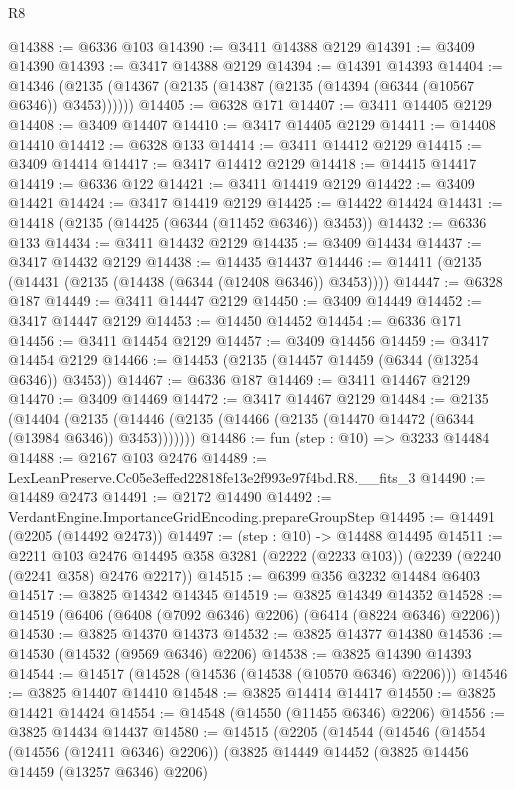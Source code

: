 \begin{lexlean}{R8}
\begin{coremodule}
@14388 := @6336 @103
@14390 := @3411 @14388 @2129
@14391 := @3409 @14390
@14393 := @3417 @14388 @2129
@14394 := @14391 @14393
@14404 := @14346 (@2135 (@14367 (@2135 (@14387 (@2135 (@14394 (@6344 (@10567 @6346)) @3453))))))
@14405 := @6328 @171
@14407 := @3411 @14405 @2129
@14408 := @3409 @14407
@14410 := @3417 @14405 @2129
@14411 := @14408 @14410
@14412 := @6328 @133
@14414 := @3411 @14412 @2129
@14415 := @3409 @14414
@14417 := @3417 @14412 @2129
@14418 := @14415 @14417
@14419 := @6336 @122
@14421 := @3411 @14419 @2129
@14422 := @3409 @14421
@14424 := @3417 @14419 @2129
@14425 := @14422 @14424
@14431 := @14418 (@2135 (@14425 (@6344 (@11452 @6346)) @3453))
@14432 := @6336 @133
@14434 := @3411 @14432 @2129
@14435 := @3409 @14434
@14437 := @3417 @14432 @2129
@14438 := @14435 @14437
@14446 := @14411 (@2135 (@14431 (@2135 (@14438 (@6344 (@12408 @6346)) @3453))))
@14447 := @6328 @187
@14449 := @3411 @14447 @2129
@14450 := @3409 @14449
@14452 := @3417 @14447 @2129
@14453 := @14450 @14452
@14454 := @6336 @171
@14456 := @3411 @14454 @2129
@14457 := @3409 @14456
@14459 := @3417 @14454 @2129
@14466 := @14453 (@2135 (@14457 @14459 (@6344 (@13254 @6346)) @3453))
@14467 := @6336 @187
@14469 := @3411 @14467 @2129
@14470 := @3409 @14469
@14472 := @3417 @14467 @2129
@14484 := @2135
    (@14404 (@2135 (@14446 (@2135 (@14466 (@2135 (@14470 @14472 (@6344 (@13984 @6346)) @3453)))))))
@14486 := fun (step : @10) => @3233 @14484
@14488 := @2167 @103 @2476
@14489 := LexLeanPreserve.Cc05e3effed22818fe13e2f993e97f4bd.R8.__fits_3
@14490 := @14489 @2473
@14491 := @2172 @14490
@14492 := VerdantEngine.ImportanceGridEncoding.prepareGroupStep
@14495 := @14491 (@2205 (@14492 @2473))
@14497 := (step : @10) -> @14488 @14495
@14511 := @2211
    @103
    @2476
    @14495
    @358
    @3281
    (@2222 (@2233 @103))
    (@2239 (@2240 (@2241 @358) @2476 @2217))
@14515 := @6399 @356 @3232 @14484 @6403
@14517 := @3825 @14342 @14345
@14519 := @3825 @14349 @14352
@14528 := @14519 (@6406 (@6408 (@7092 @6346) @2206) (@6414 (@8224 @6346) @2206))
@14530 := @3825 @14370 @14373
@14532 := @3825 @14377 @14380
@14536 := @14530 (@14532 (@9569 @6346) @2206)
@14538 := @3825 @14390 @14393
@14544 := @14517 (@14528 (@14536 (@14538 (@10570 @6346) @2206)))
@14546 := @3825 @14407 @14410
@14548 := @3825 @14414 @14417
@14550 := @3825 @14421 @14424
@14554 := @14548 (@14550 (@11455 @6346) @2206)
@14556 := @3825 @14434 @14437
@14580 := @14515
    (@2205
      (@14544
        (@14546
          (@14554 (@14556 (@12411 @6346) @2206))
          (@3825
            @14449
            @14452
            (@3825 @14456 @14459 (@13257 @6346) @2206)

\end{coremodule}
\end{lexlean}
